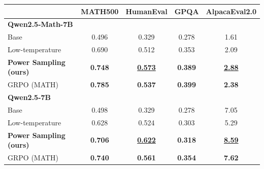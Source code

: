 \documentclass{article}
\begin{document}
\begin{table}[t]
\centering
\small
\begin{tabular}{p{4cm}cccc}
\toprule
 & MATH500 & HumanEval & GPQA & AlpacaEval2.0 \\
\midrule

\multicolumn{5}{l}{\textbf{Qwen2.5-Math-7B}} \\
\hspace{0.5cm}Base     &  0.496    &    0.329  &   0.278   &  1.61    \\
\hspace{0.5cm}Low-temperature &  0.690    &     0.512 &  0.353  &   2.09   \\
\hspace{0.5cm}\textbf{Power Sampling (ours)}     & \textbf{0.748}     &     \underline{\textbf{0.573}} &  \textbf{{0.389}}     &   \underline{\textbf{2.88}}   \\
\cmidrule[\lightrulewidth](lr){1-5}
\hspace{0.5cm}GRPO (MATH)    &  \textbf{0.785}   &    \textbf{0.537}  &   \textbf{0.399}   &   \textbf{2.38}   \\
\midrule

\multicolumn{5}{l}{\textbf{Qwen2.5-7B}} \\
\hspace{0.5cm}Base     &   0.498   &     0.329 &   0.278   &   7.05   \\
\hspace{0.5cm}Low-temperature & 0.628     &     0.524 &   0.303   &   5.29   \\
\hspace{0.5cm}\textbf{Power Sampling (ours)}     &  \textbf{0.706}    &     \underline{\textbf{0.622}} &   \textbf{0.318}   &   \underline{\textbf{8.59}}   \\
\cmidrule[\lightrulewidth](lr){1-5}
\hspace{0.5cm}GRPO (MATH)    &  \textbf{0.740}    &   \textbf{0.561}   &    \textbf{0.354}  &   \textbf{7.62}   \\
\midrule


\end{tabular}
\end{table}
\end{document}
